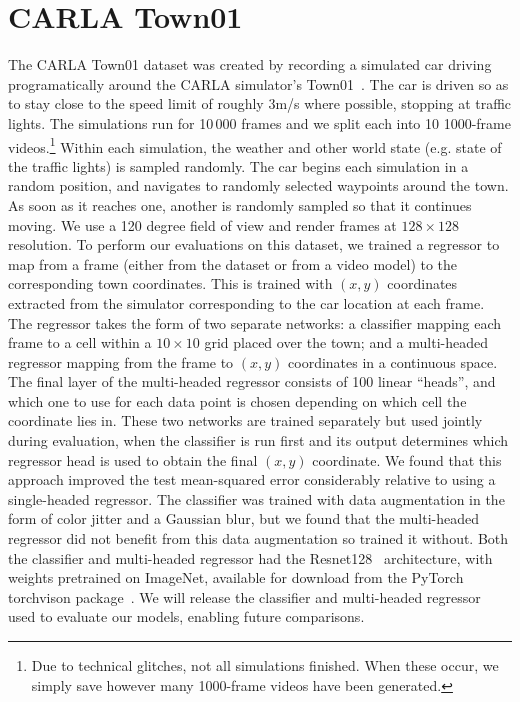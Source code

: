 \section{CARLA Town01}
The CARLA Town01 dataset was created by recording a simulated car driving programatically around the CARLA simulator's Town01~\cite{dosovitskiy2017carla}. The car is driven so as to stay close to the speed limit of roughly $3$m/s where possible, stopping at traffic lights. The simulations run for 10\,000 frames and we split each into 10 1000-frame videos.\footnote{Due to technical glitches, not all simulations finished. When these occur, we simply save however many 1000-frame videos have been generated.} Within each simulation, the weather and other world state (e.g. state of the traffic lights) is sampled randomly. The car begins each simulation in a random position, and navigates to randomly selected waypoints around the town. As soon as it reaches one, another is randomly sampled so that it continues moving. We use a 120 degree field of view and render frames at $128\times128$ resolution.
%
To perform our evaluations on this dataset, we trained a regressor to map from a frame (either from the dataset or from a video model) to the corresponding town coordinates. This is trained with $(x,y)$ coordinates extracted from the simulator corresponding to the car location at each frame. The regressor takes the form of two separate networks: a classifier mapping each frame to a cell within a $10\times10$ grid placed over the town; and a multi-headed regressor mapping from the frame to $(x,y)$ coordinates in a continuous space. The final layer of the multi-headed regressor consists of 100 linear ``heads'', and which one to use for each data point is chosen depending on which cell the coordinate lies in. These two networks are trained separately but used jointly during evaluation, when the classifier is run first and its output determines which regressor head is used to obtain the final $(x,y)$ coordinate. We found that this approach improved the test mean-squared error considerably relative to using a single-headed regressor. The classifier was trained with data augmentation in the form of color jitter and a Gaussian blur, but we found that the multi-headed regressor did not benefit from this data augmentation so trained it without. Both the classifier and multi-headed regressor had the Resnet128~\citep{he2015deep} architecture, with weights pretrained on ImageNet, available for download from the PyTorch torchvison package~\citep{paszke2017automatic}. We will release the classifier and multi-headed regressor used to evaluate our models, enabling future comparisons.

